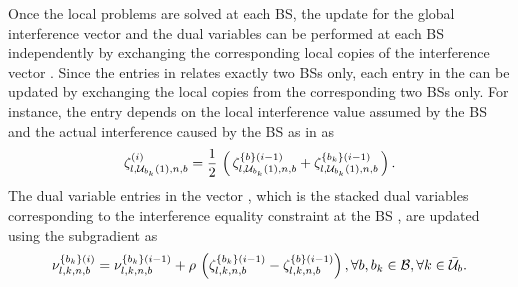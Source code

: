 Once the local problems are solved at each \ac{BS}, the update for the global interference vector  and the dual variables  can be performed at each \ac{BS} independently by exchanging the corresponding local copies of the interference vector . Since the entries in  relates exactly two \acp{BS} only, each entry in the  can be updated by exchanging the local copies from the corresponding two \acp{BS} only. For instance, the entry  depends on the local interference value  assumed by the \ac{BS}  and the actual interference caused by the \ac{BS}  as in  as
\begin{equation}
\zeta_{l,\mc{U}_{b_k}(1),n,b}^{(i)} = \frac{1}{2} \, \left ( \, \zeta^{\set{b}(i-1)}_{l,\mc{U}_{b_k}(1),n,b} + \zeta^{\set{b_k}(i-1)}_{l,\mc{U}_{b_k}(1),n,b} \, \right ).
\label{zeta_update}
\end{equation}
The dual variable entries in the vector , which is the stacked dual variables corresponding to the interference equality constraint at the \ac{BS} , are updated using the subgradient as
\begin{equation}\label{dual-sg-update}
\nu^{\set{b_k}(i)}_{l,k,n,b} = \nu^{\set{b_k}(i-1)}_{l,k,n,b} + \rho \, \left (\zeta^{\set{b_k}(i-1)}_{l,k,n,b} - \zeta^{\set{b}(i-1)}_{l,k,n,b} \right ), \forall b,b_k \in \mc{B}, \forall k \in \bar{\mc{U}}_{b}.
\end{equation}

